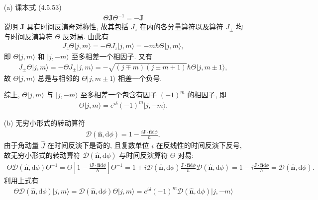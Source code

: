 \documentclass{assignment}
\begin{document}
\begin{pf}
    \begin{itemize}
        \item[(a)] 课本式 (4.5.53)
        \begin{align}
            \Theta\bm{J}\Theta^{-1}=-\bm{J}
        \end{align}
        说明 $\bm{J}$ 具有时间反演奇对称性, 故其包括 $J_z$ 在内的各分量算符以及算符 $J_{\pm}$ 均与时间反演算符 $\Theta$ 反对易.
        由此有
        \begin{align}
            J_z\Theta\lvert j,m\rangle=-\Theta J_z\lvert j,m\rangle=-m\hbar\Theta\lvert j,m\rangle,
        \end{align}
        即 $\Theta\lvert j,m\rangle$ 和 $\lvert j,-m\rangle$ 至多相差一个相因子.
        又有
        \begin{align}
            J_{\pm}\Theta\lvert j,m\rangle=-\Theta J_{\pm}\lvert j,m\rangle=-\sqrt{(j\mp m)(j\pm m+1)}\hbar\Theta\lvert j,m\pm 1\rangle,
        \end{align}
        故 $\Theta\lvert j,m\rangle$ 总是与相邻的 $\Theta\lvert j,m\pm 1\rangle$ 相差一个负号.

        综上, $\Theta\lvert j,m\rangle$ 与 $\lvert j,-m\rangle$ 至多相差一个包含有因子 $(-1)^m$ 的相因子, 即
        \begin{align}
            \Theta\lvert j,m\rangle=e^{i\delta}(-1)^m\lvert j,-m\rangle.
        \end{align}
        \item[(b)] 无穷小形式的转动算符
        \begin{align}
            \mathscr{D}(\hat{\bm{n}},\mathrm{d}\phi)=1-\frac{i\bm{J}\cdot\hat{\bm{n}}\mathrm{d}\phi}{\hbar},
        \end{align}
        由于角动量 $\hat{J}$ 在时间反演下是奇的, 且复数单位 $i$ 在反线性的时间反演下反号, 故无穷小形式的转动算符 $\mathscr{D}(\hat{\bm{n}},\mathrm{d}\phi)$ 与时间反演算符 $\Theta$ 对易:
        \begin{align}
            \Theta\mathscr{D}(\hat{\bm{n}},\mathrm{d}\phi)\Theta^{-1}=\Theta\left[1-\frac{i\bm{J}\cdot\hat{\bm{n}}\mathrm{d}\phi}{\hbar}\right]\Theta^{-1}=1+i\mathscr{D}(\hat{\bm{n}},\mathrm{d}\phi)\frac{\bm{J}\cdot\hat{\bm{n}}\mathrm{d}\phi}{\hbar}\mathscr{D}(\hat{\bm{n}},\mathrm{d}\phi)=1-i\frac{\bm{J}\cdot\hat{\bm{n}}\mathrm{d}\phi}{\hbar}=\mathscr{D}(\hat{\bm{n}},\mathrm{d}\phi).
        \end{align}
        利用上式有
        \begin{align}
            \Theta\mathscr{D}(\hat{\bm{n}},\mathrm{d}\phi)\lvert j,m\rangle=\mathscr{D}(\hat{\bm{n}},\mathrm{d}\phi)\Theta\lvert j,m\rangle=e^{i\delta}(-1)^m\mathscr{D}(\hat{\bm{n}},\mathrm{d}\phi)\lvert j,-m\rangle
        \end{align}


\end{itemize}
\end{pf}
\end{document}
